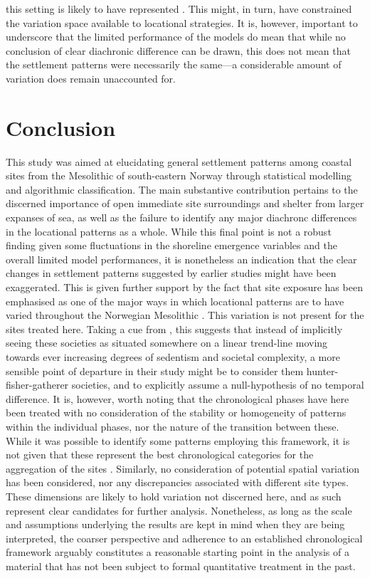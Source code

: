 \documentclass[12pt, a4paper]{article}
\begin{document}
this setting is likely to have represented \citep[][]{glorstad2013}. This might, in turn, have constrained the variation space available to locational strategies. It is, however, important to underscore that the limited performance of the models do mean that while no conclusion of clear diachronic difference can be drawn, this does not mean that the settlement patterns were necessarily the same---a considerable amount of variation does remain unaccounted for.

\section{Conclusion}
This study was aimed at elucidating general settlement patterns among coastal sites from the Mesolithic of south-eastern Norway through statistical modelling and algorithmic classification. The main substantive contribution pertains to the discerned importance of open immediate site surroundings and shelter from larger expanses of sea, as well as the failure to identify any major diachronc differences in the locational patterns as a whole. While this final point is not a robust finding given some fluctuations in the shoreline emergence variables and the overall limited model performances, it is nonetheless an indication that the clear changes in settlement patterns suggested by earlier studies might have been exaggerated. This is given further support by the fact that site exposure has been emphasised as one of the major ways in which locational patterns are to have varied throughout the Norwegian Mesolithic \citep[e.g.][]{breivik2014}. This variation is not present for the sites treated here. Taking a cue from \cite{aastveit2014}, this suggests that instead of implicitly seeing these societies as situated somewhere on a linear trend-line moving towards ever increasing degrees of sedentism and societal complexity, a more sensible point of departure in their study might be to consider them hunter-fisher-gatherer societies, and to explicitly assume a null-hypothesis of no temporal difference. It is, however, worth noting that the chronological phases have here been treated with no consideration of the stability or homogeneity of patterns within the individual phases, nor the nature of the transition between these. While it was possible to identify some patterns employing this framework, it is not given that these represent the best chronological categories for the aggregation of the sites \citep{reitan2016}. Similarly, no consideration of potential spatial variation has been considered, nor any discrepancies associated with different site types. These dimensions are likely to hold variation not discerned here, and as such represent clear candidates for further analysis. Nonetheless, as long as the scale and assumptions underlying the results are kept in mind when they are being interpreted, the coarser perspective and adherence to an established chronological framework arguably constitutes a reasonable starting point in the analysis of a material that has not been subject to formal quantitative treatment in the past.\par
\end{document}
